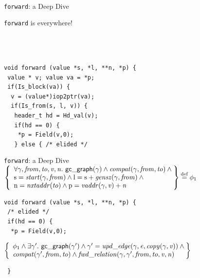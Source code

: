 \documentclass[usenames, xcolor=dvipsnames]{beamer}
\makeatletter
\newcommand{\defeq}{\mathbin{\overset{\mathrm{def}}{=}}}
\newcommand{\braces}[1]{\left\{\begin{array}{l@{}} #1 \end{array}\right\}}
\newcommand{\m}[1]{\ensuremath{\mathit{#1}}} %
\newcommand{\p}[1]{\ensuremath{\mathsf{#1}}} %
\makeatother
\begin{document}
\begin{frame}[fragile]{\texttt{forward}: a Deep Dive}

\texttt{forward} is everywhere! 
\\
\\ 
\\
\\

\bigskip

\begin{Verbatim}
void forward (value *s, *l, **n, *p) { 
 value * v; value va = *p;
 if(Is_block(va)) {
  v = (value*)iop2ptr(va);
  if(Is_from(s, l, v)) {
   header_t hd = Hd_val(v);
   if(hd == 0) {
    *p = Field(v,0);
   } else { /* elided */
\end{Verbatim}
\end{frame}

\newcommand{\ga}{\gamma}
\newcommand{\tx}[1]{\text{#1}}


\begin{frame}[fragile]{\texttt{forward}: a Deep Dive}
$\braces{\forall \ga, \m{from}, \m{to}, \m{v}, \m{n}.~\p{gc{\_}graph}(\ga) \wedge \m{compat}(\ga, \m{from}, \m{to}) \wedge \null \\ \tx{s} = \m{start}(\ga, \m{from}) \wedge \tx{l} = \tx{s} + \m{gensz}(\ga, \m{from}) \wedge \null \\  \tx{n} = \m{nxtaddr}(\m{to}) \wedge \tx{p} = \m{vaddr}(\ga, \m{v}) + \m{n}} \defeq \phi_1$

\begin{Verbatim}
void forward (value *s, *l, **n, *p) { 
 /* elided */
 if(hd == 0) {
  *p = Field(v,0);
\end{Verbatim}
\pause
$\braces{\phi_{1} \wedge \exists \ga'.~\p{gc{\_}graph}(\ga') \wedge \ga' = \m{upd\_edge}(\ga, \m{e}, \m{copy}(\ga, \m{v})) \wedge \null \\ \m{compat}(\ga', \m{from}, \m{to}) \wedge \m{fwd\_relation}(\ga, \ga', \m{from}, \m{to}, \m{v}, \m{n})}$
\begin{Verbatim}
 }
\end{Verbatim}
\end{frame}
\end{document}
